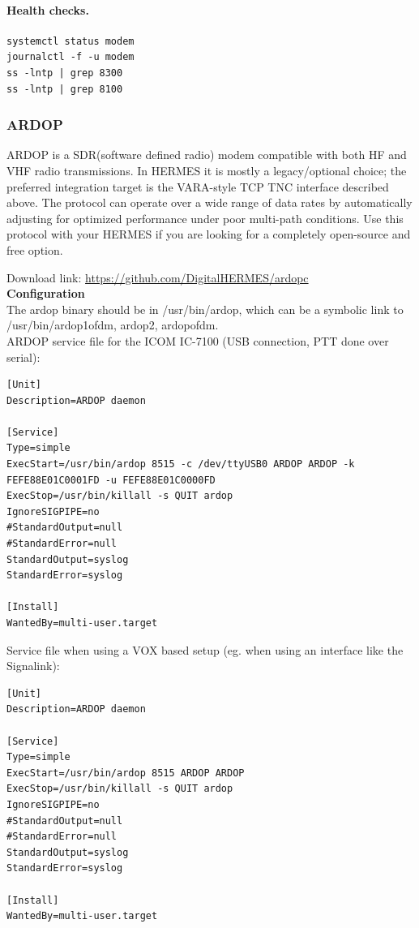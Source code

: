 \paragraph{Health checks.}
\begin{verbatim}
systemctl status modem
journalctl -f -u modem
ss -lntp | grep 8300
ss -lntp | grep 8100
\end{verbatim}

\subsubsection{ARDOP}

ARDOP is a SDR(software defined radio) modem compatible with both HF and VHF radio transmissions. In HERMES it is mostly a legacy/optional
choice; the preferred integration target is the VARA-style TCP TNC interface described above.
The protocol can operate over a wide range of data rates by automatically adjusting for optimized performance under poor multi-path conditions.
Use this protocol with your HERMES if you are looking for a completely open-source and free option.

Download link: \url{https://github.com/DigitalHERMES/ardopc}\\

\textbf{Configuration}\\

The ardop binary should be in /usr/bin/ardop, which can be a
symbolic link to /usr/bin/{ardop1ofdm, ardop2, ardopofdm}.\\

ARDOP service file for the ICOM IC-7100 (USB connection, PTT done over serial):
\begin{verbatim}
[Unit]
Description=ARDOP daemon

[Service]
Type=simple
ExecStart=/usr/bin/ardop 8515 -c /dev/ttyUSB0 ARDOP ARDOP -k FEFE88E01C0001FD -u FEFE88E01C0000FD
ExecStop=/usr/bin/killall -s QUIT ardop
IgnoreSIGPIPE=no
#StandardOutput=null
#StandardError=null
StandardOutput=syslog
StandardError=syslog

[Install]
WantedBy=multi-user.target
\end{verbatim}

Service file when using a VOX based setup (eg. when using an interface like
the Signalink):
\begin{verbatim}
[Unit]
Description=ARDOP daemon

[Service]
Type=simple
ExecStart=/usr/bin/ardop 8515 ARDOP ARDOP
ExecStop=/usr/bin/killall -s QUIT ardop
IgnoreSIGPIPE=no
#StandardOutput=null
#StandardError=null
StandardOutput=syslog
StandardError=syslog

[Install]
WantedBy=multi-user.target
\end{verbatim}


